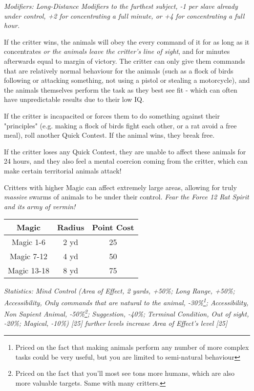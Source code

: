 \begin{multicols*}{3}
	\textcolor{NavyBlue}{\textit{Modifiers: Long-Distance Modifiers to the furthest subject, -1 per slave already under control, +2 for concentrating a full minute, or +4 for concentrating a full hour.}}
	
	If the critter wins, the animals will obey the every command of it for as long as it concentrates \textit{or the animals leave the critter's line of sight}, and for minutes afterwards equal to margin of victory. The critter can only give them commands that are relatively normal behaviour for the animals (such as a flock of birds following or attacking something, not using a pistol or stealing a motorcycle), and the animals themselves perform the task as they best see fit - which can often have unpredictable results due to their low IQ.
	
	If the critter is incapacited or forces them to do something against their "principles" (e.g. making a flock of birds fight each other, or a rat avoid a free meal), roll another Quick Contest. If the animal wins, they break free.
	
	If the critter loses any Quick Contest, they are unable to affect these animals for 24 hours, and they also feel a mental coercion coming from the critter, which can make certain territorial animals attack!
	
	Critters with higher Magic can affect extremely large areas, allowing for truly \textit{massive} swarms of animals to be under their control. \textit{Fear the Force 12 Rat Spirit and its army of vermin!}
	
	\begin{center}
		\begin{tabular}{|c|c|c|}
			\hline
			Magic & Radius & Point Cost\\
			\hline
			\hline
			Magic 1-6 & 2 yd & 25 \\
			Magic 7-12 & 4 yd & 50 \\
			Magic 13-18 & 8 yd & 75 \\
			\hline
		\end{tabular}
	\end{center}
	
	\textcolor{OliveGreen}{\textit{Statistics: Mind Control (Area of Effect, 2 yards, +50\%; Long Range, +50\%; Accessibility, Only commands that are natural to the animal, -30\%\footnote{Priced on the fact that making animals perform any number of more complex tasks could be very useful, but you are limited to semi-natural behaviour}; Accessibility, Non Sapient Animal, -50\%\footnote{Priced on the fact that you'll most see tons more humans, which are also more valuable targets. Same with many critters.}; Suggestion, -40\%; Terminal Condition, Out of sight, -20\%; Magical, -10\%) [25] further levels increase Area of Effect's level [25]}}
	

\end{multicols*}
